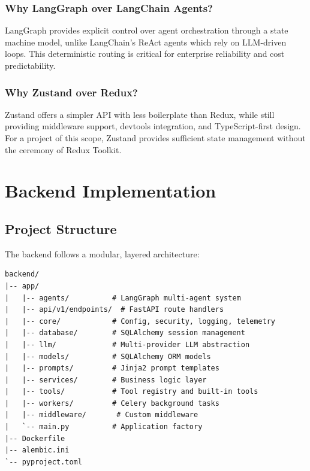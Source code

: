 \documentclass[12pt, a4paper]{report}
\begin{document}
\subsection{Why LangGraph over LangChain Agents?}
LangGraph provides explicit control over agent orchestration through a state machine model, unlike LangChain's ReAct agents which rely on LLM-driven loops. This deterministic routing is critical for enterprise reliability and cost predictability.

\subsection{Why Zustand over Redux?}
Zustand offers a simpler API with less boilerplate than Redux, while still providing middleware support, devtools integration, and TypeScript-first design. For a project of this scope, Zustand provides sufficient state management without the ceremony of Redux Toolkit.

\chapter{Backend Implementation}

\section{Project Structure}

The backend follows a modular, layered architecture:

\begin{lstlisting}[language={}, caption={Backend Directory Structure}]
backend/
|-- app/
|   |-- agents/          # LangGraph multi-agent system
|   |-- api/v1/endpoints/  # FastAPI route handlers
|   |-- core/            # Config, security, logging, telemetry
|   |-- database/        # SQLAlchemy session management
|   |-- llm/             # Multi-provider LLM abstraction
|   |-- models/          # SQLAlchemy ORM models
|   |-- prompts/         # Jinja2 prompt templates
|   |-- services/        # Business logic layer
|   |-- tools/           # Tool registry and built-in tools
|   |-- workers/         # Celery background tasks
|   |-- middleware/       # Custom middleware
|   `-- main.py          # Application factory
|-- Dockerfile
|-- alembic.ini
`-- pyproject.toml
\end{lstlisting}
\end{document}
